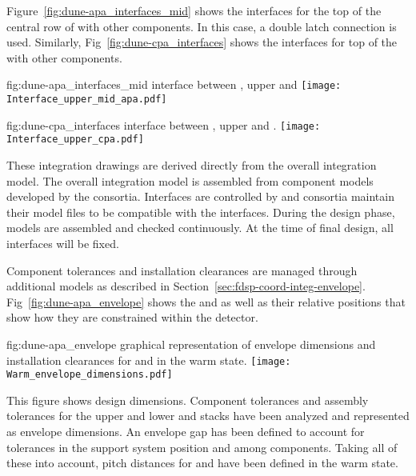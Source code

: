 Figure~\ref{fig:dune-apa_interfaces_mid} shows the interfaces for the
top of the central row of  with other components. In this case, a
double latch connection is used. Similarly,
Fig~\ref{fig:dune-cpa_interfaces} shows the interfaces for top of the
 with other components.
\begin{dunefigure}{fig:dune-apa_interfaces_mid}
  { interface between , upper  and }
  \texttt{[image: Interface\_upper\_mid\_apa.pdf]}
\end{dunefigure}
\begin{dunefigure}
    {fig:dune-cpa_interfaces}
  { interface between , upper  and .}
  \texttt{[image: Interface\_upper\_cpa.pdf]}
\end{dunefigure}

These integration drawings are derived directly from the overall
integration model. The overall integration model is assembled from
component models developed by the consortia. Interfaces are controlled
by  and consortia maintain their model files to be
compatible with the interfaces. During the design phase, models are
assembled and checked continuously. At the time of final design, all
interfaces will be fixed.


Component tolerances and installation clearances are managed through
additional models as described in
Section~\ref{sec:fdsp-coord-integ-envelope}.
Fig~\ref{fig:dune-apa_envelope} shows the  and
 as well as their relative positions that show how they are
constrained within the detector.
\begin{dunefigure}{fig:dune-apa_envelope} { graphical
    representation of envelope dimensions and installation clearances
    for  and  in the warm state.}
  \texttt{[image: Warm\_envelope\_dimensions.pdf]}
\end{dunefigure}


This figure shows design dimensions. Component tolerances and assembly
tolerances for the upper and lower  and  stacks
have been analyzed and represented as envelope dimensions. An envelope
gap has been defined to account for tolerances in the support system
position and among components. Taking all of these into account, pitch
distances for  and  have been defined in the
warm state.

